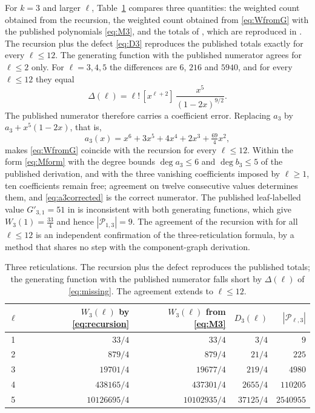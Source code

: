 \documentclass[11pt,a4paper]{article}
\theoremstyle{definition}
\newcommand{\cP}{\mathcal{P}}
\begin{document}
For $k=3$ and larger $\ell$, Table~\ref{tab:k3} compares three quantities: the weighted count obtained from the recursion, the weighted count obtained from \eqref{eq:WfromG} with the published polynomials \eqref{eq:M3}, and the totals of \cite{Yu26}, which are reproduced in \cite[Table~1]{YuZhang26}. The recursion plus the defect \eqref{eq:D3} reproduces the published totals exactly for every $\ell\le12$. The generating function with the published numerator agrees for $\ell\le2$ only. For $\ell=3,4,5$ the differences are $6$, $216$ and $5940$, and for every $\ell\le12$ they equal
\begin{equation}\label{eq:missing}
\Delta(\ell)=\ell!\,[x^{\ell+2}]\,\frac{x^5}{(1-2x)^{9/2}}.
\end{equation}
The published numerator therefore carries a coefficient error. Replacing $a_3$ by $a_3+x^5(1-2x)$, that is,
\begin{equation}\label{eq:a3corrected}
a_3(x)=x^6+3x^5+4x^4+2x^3+\tfrac{69}{4}x^2,
\end{equation}
makes \eqref{eq:WfromG} coincide with the recursion for every $\ell\le12$. Within the form \eqref{eq:Mform} with the degree bounds $\deg a_3\le6$ and $\deg b_3\le5$ of the published derivation, and with the three vanishing coefficients imposed by $\ell\ge1$, ten coefficients remain free; agreement on twelve consecutive values determines them, and \eqref{eq:a3corrected} is the correct numerator. The published leaf-labelled value $G'_{3,1}=51$ in \cite[Eq.~(30)]{Mansouri22} is inconsistent with both generating functions, which give $W_3(1)=\tfrac{33}{4}$ and hence $|\cP_{1,3}|=9$. The agreement of the recursion with \cite{Yu26} for all $\ell\le12$ is an independent confirmation of the three-reticulation formula, by a method that shares no step with the component-graph derivation.

\begin{table}[t]
\centering
\begin{tabular}{crrrr}
\toprule
$\ell$ & $W_3(\ell)$ by \eqref{eq:recursion} & $W_3(\ell)$ from \eqref{eq:M3} & $D_3(\ell)$ & $|\cP_{\ell,3}|$ \cite{Yu26}\\
\midrule
1 & $33/4$ & $33/4$ & $3/4$ & $9$\\
2 & $879/4$ & $879/4$ & $21/4$ & $225$\\
3 & $19701/4$ & $19677/4$ & $219/4$ & $4980$\\
4 & $438165/4$ & $437301/4$ & $2655/4$ & $110205$\\
5 & $10126695/4$ & $10102935/4$ & $37125/4$ & $2540955$\\
\bottomrule
\end{tabular}
\caption{Three reticulations. The recursion plus the defect reproduces the published totals; the generating function with the published numerator falls short by $\Delta(\ell)$ of \eqref{eq:missing}. The agreement extends to $\ell\le12$.}
\label{tab:k3}
\end{table}
\end{document}
